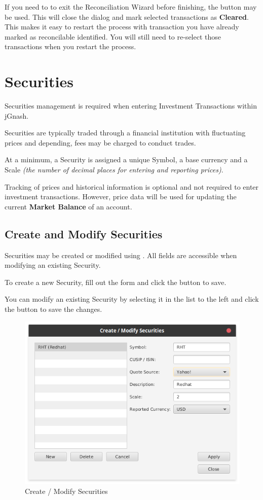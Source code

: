 \documentclass[letterpaper,12pt]{book}
\begin{document}
    If you need to to exit the Reconciliation Wizard before finishing, the  button may be used.
    This will close the dialog and mark selected transactions as \textbf{Cleared}.
    This makes it easy to restart the process with transaction you have already marked as reconcilable identified.
    You will still need to re-select those transactions when you restart the process.

    \chapter{Securities}
    \label{ch:securities}
    Securities management is required when entering Investment Transactions within jGnash.  
    
    Securities are typically traded through a financial institution with fluctuating prices and 
    depending, fees may be charged to conduct trades.
        
    At a minimum, a Security is assigned a unique Symbol, a base currency and a Scale \textit{(the number of decimal places 
    for entering and reporting prices)}.  

    Tracking of prices and historical information is optional and not required to enter
    investment transactions.  However, price data will be used for updating the current \textbf{Market Balance} of an account.
    
    
    \section{Create and Modify Securities}
    
    Securities may be created or modified using .  All fields are
    accessible when modifying an existing Security.
    
    To create a new Security, fill out the form and click the  button to save.
    
    You can modify an existing Security by selecting it in the list to the left and click 
    the  button to save the changes.
    
    \begin{figure}[h]
        \caption{Create / Modify Securities}
        \includegraphics[width=0.6\linewidth]{images/createModifySecurities}
    \end{figure}
\end{document}
